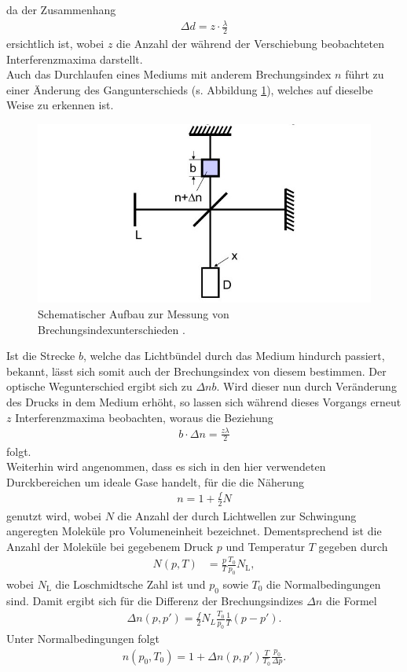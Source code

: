 da der Zusammenhang
\begin{align}
\Delta d = z \cdot \frac{\lambda}{2}
\end{align}
ersichtlich ist, wobei $z$ die Anzahl der während der Verschiebung beobachteten Interferenzmaxima darstellt. \\
Auch das Durchlaufen eines Mediums mit anderem Brechungsindex $n$ führt zu einer Änderung des Gangunterschieds (s. Abbildung \ref{fig:brechzahl}), welches
auf dieselbe Weise zu erkennen ist. 
\begin{figure}
  \centering
  \includegraphics[scale=0.7]{Brechzahl.jpg}
  \caption{Schematischer Aufbau zur Messung von Brechungsindexunterschieden \cite{Anleitung}.}
  \label{fig:brechzahl}
\end{figure}
Ist die Strecke $b$, welche das Lichtbündel durch das Medium hindurch passiert, bekannt,
lässt sich somit auch der Brechungsindex von diesem bestimmen. Der optische Wegunterschied ergibt sich zu $\Delta n b$.
Wird dieser nun durch Veränderung des Drucks in dem Medium erhöht, so lassen sich während dieses Vorgangs 
erneut $z$ Interferenzmaxima beobachten, woraus die Beziehung 
\begin{align}
 b \cdot \Delta n = \frac{z \lambda}{2}
\end{align}
folgt. \\
Weiterhin wird angenommen, dass es sich in den hier verwendeten Durckbereichen um ideale Gase handelt, für die die Näherung
\begin{align}
n = 1 + \frac{f}{2} N
\end{align}
genutzt wird, wobei $N$ die Anzahl der durch Lichtwellen zur Schwingung angeregten Moleküle pro Volumeneinheit bezeichnet.
Dementsprechend ist die Anzahl der Moleküle bei gegebenem Druck $p$ und Temperatur $T$ gegeben durch
\begin{align*}
N(p,T) &= \frac{p}{T}\frac{T_0}{p_0}N_\text{L},  
\end{align*}
wobei $N_\text{L}$ die Loschmidtsche Zahl ist und $p_\text{0}$ sowie $T_\text{0}$ die Normalbedingungen sind.
Damit ergibt sich für die Differenz der Brechungsindizes $\Delta n$ die Formel
\begin{align}
\Delta n(p,p') = \frac{f}{2}N_L\frac{T_0}{p_0}\frac{1}{T}(p-p').
\end{align}
Unter Normalbedingungen folgt
\begin{align}
  n(p_0,T_0) = 1 + \Delta n(p,p')\frac{T}{T_0}\frac{p_0}{\Delta p}.
\end{align}